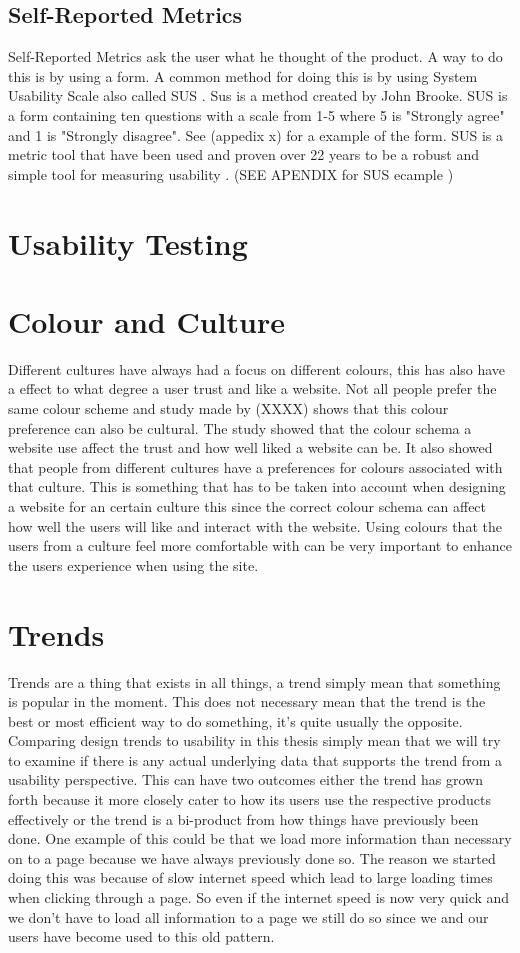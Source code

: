 \subsection{Self-Reported Metrics}
Self-Reported Metrics ask the user what he thought of the product. A way to do this is by using a form. A common method for doing this is by using System Usability Scale also called SUS \cite{tullis_albert_2011} \cite{brooke1996sus}. Sus is a method created by John Brooke. SUS is a form containing ten questions with a scale from 1-5 where 5 is "Strongly agree" and 1 is "Strongly disagree". See (appedix x) for a example of the form. SUS is a metric tool that have been used and proven over 22 years to be a robust and simple tool for measuring usability \cite{brooke1996sus}.  (SEE APENDIX for SUS ecample )
\section{Usability Testing}

\section{Colour and Culture}
Different cultures have always had a focus on different colours, this has also have a effect to what degree a user trust and like a website. Not all people prefer the same colour scheme and study made by (XXXX) \cite{Color} shows that this colour preference can also be cultural. The study showed that the colour schema a website use affect the trust and how well liked a website can be. It also showed that people from different cultures have a preferences for colours associated with that culture. This is something that has to be taken into account when designing a website for an certain culture this since the correct colour schema can affect how well the users will like and interact with the website. Using colours that the users from a culture feel more comfortable with can be very important to enhance the users experience when using the site.
\section{Trends}
Trends are a thing that exists in all things, a trend simply mean that something is popular in the moment. This does not necessary mean that the trend is the best or most efficient way to do something, it's quite usually the opposite. Comparing design trends to usability in this thesis simply mean that we will try to examine if there is any actual underlying data that supports the trend from a usability perspective. This can have two outcomes either the trend has grown forth because it more closely cater to how its users use the respective products effectively or the trend is a bi-product from how things have previously been done. One example of this could be that we load more information than necessary on to a page because we have always previously done so. The reason we started doing this was because of slow internet speed which lead to large loading times when clicking through a page. So even if the internet speed is now very quick and we don't have to load all information to a page we still do so since we and our users have become used to this old pattern.

